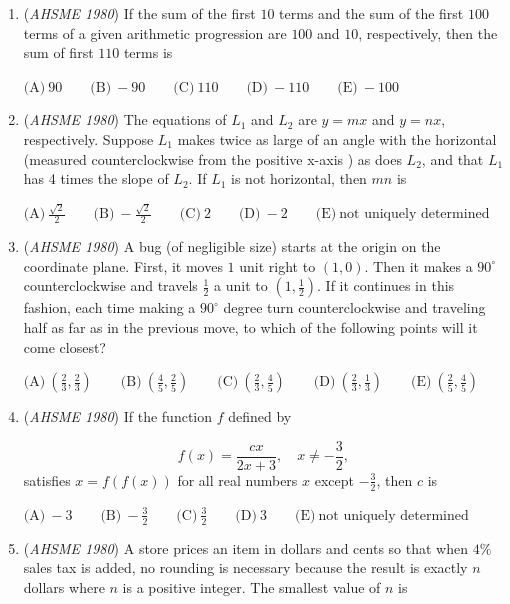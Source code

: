 \begin{enumerate}
 $\text{(A)} \ x: y: z ~~\text{(B)} \ z: y: x ~~ \text{(C)} \ y: z: x~~ \text{(D)} \ yz: xz: xy ~~ \text{(E)} \ xz: yx: zy$


	\item (\textit{AHSME 1980}) If the sum of the first $10$ terms and the sum of the first $100$ terms of a given arithmetic progression are $100$ and $10$, 
respectively, then the sum of first $110$ terms is


 $\text{(A)} \ 90 \qquad \text{(B)} \ -90 \qquad \text{(C)} \ 110 \qquad \text{(D)} \ -110 \qquad \text{(E)} \ -100$


	\item (\textit{AHSME 1980}) The equations of $L_1$ and $L_2$ are $y=mx$ and $y=nx$, respectively. Suppose $L_1$ makes twice as large of an angle with the horizontal (measured counterclockwise from the positive x-axis ) as does $L_2$, and that $L_1$ has 4 times the slope of $L_2$. If $L_1$ is not horizontal, then $mn$ is


 $\text{(A)} \ \frac{\sqrt{2}}{2} \qquad \text{(B)} \ -\frac{\sqrt{2}}{2} \qquad \text{(C)} \ 2 \qquad \text{(D)} \ -2 \qquad \text{(E)} \ \text{not uniquely determined}$


	\item (\textit{AHSME 1980}) A bug (of negligible size) starts at the origin on the coordinate plane. First, it moves $1$ unit right to $(1,0)$. Then it makes a $90^\circ$ counterclockwise and travels $\frac 12$ a unit to $\left(1, \frac 12 \right)$. If it continues in this fashion, each time making a $90^\circ$ degree turn counterclockwise and traveling half as far as in the previous move, to which of the following points will it come closest? 


 $\text{(A)} \ \left(\frac 23, \frac 23 \right) \qquad \text{(B)} \ \left( \frac 45, \frac 25 \right) \qquad \text{(C)} \ \left( \frac 23, \frac 45 \right) \qquad \text{(D)} \ \left(\frac 23, \frac 13 \right) \qquad \text{(E)} \ \left(\frac 25, \frac 45 \right)$


	\item (\textit{AHSME 1980}) If the function $f$ defined by 

 \[f(x)=\frac{cx}{2x+3} ,\quad x\neq -\frac{3}{2} ,\] 
satisfies $x=f(f(x))$ for all real numbers $x$ except $-\frac{3}{2}$, then $c$ is


 $\text{(A)} \ -3 \qquad  \text{(B)} \ - \frac{3}{2} \qquad  \text{(C)} \ \frac{3}{2} \qquad  \text{(D)} \ 3 \qquad  \text{(E)} \ \text{not uniquely determined}$


	\item (\textit{AHSME 1980}) A store prices an item in dollars and cents so that when $4\%$ sales tax is added, no rounding is necessary because the result is exactly $n$ dollars where $n$ is a positive integer. The smallest value of $n$ is



\end{enumerate}
